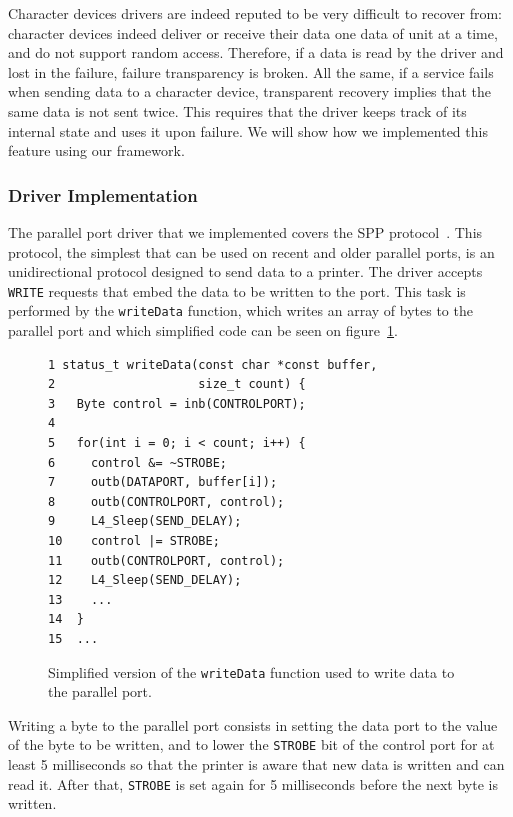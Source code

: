 \documentclass{acm_proc_article-sp}
\begin{document}
Character devices drivers are indeed reputed to be very difficult to recover from: character devices indeed deliver or receive their data one data of unit at a time, and do not support random access. Therefore, if a data is read by the driver and lost in the failure, failure transparency is broken. All the same, if a service fails when sending data to a character device, transparent recovery implies that the same data is not sent twice. This requires that the driver keeps track of its internal state and uses it upon failure. We will show how we implemented this feature using our framework.

\subsubsection{Driver Implementation}
The parallel port driver that we implemented covers the SPP protocol~\cite{Peacock2007}. This protocol, the simplest that can be used on recent and older parallel ports, is an unidirectional protocol designed to send data to a printer. The driver accepts \texttt{WRITE} requests that embed the data to be written to the port. This task is performed by the \texttt{writeData} function, which writes an array of bytes to the parallel port and which simplified code can be seen on figure~\ref{fig:writeData}.

\begin{figure}[]
\centering
\begin{screen}
\begin{verbatim}
1 status_t writeData(const char *const buffer,
2                    size_t count) {
3   Byte control = inb(CONTROLPORT);
4 
5   for(int i = 0; i < count; i++) {
6     control &= ~STROBE;
7     outb(DATAPORT, buffer[i]);
8     outb(CONTROLPORT, control);
9     L4_Sleep(SEND_DELAY);
10    control |= STROBE;
11    outb(CONTROLPORT, control);
12    L4_Sleep(SEND_DELAY);
13    ...
14  }
15  ...
\end{verbatim}
\end{screen}
\caption{Simplified version of the \texttt{writeData} function used to write data to the parallel port.}
\label{fig:writeData}
\end{figure}

Writing a byte to the parallel port consists in setting the data port to the value of the byte to be written, and to lower the \texttt{STROBE} bit of the control port for at least 5 milliseconds so that the printer is aware that new data is written and can read it. After that, \texttt{STROBE} is set again for 5 milliseconds before the next byte is written.
\end{document}
